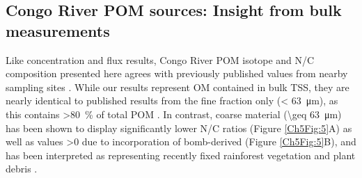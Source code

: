 \subsection{Congo River POM sources: Insight from bulk measurements}

Like concentration and flux results, Congo River POM isotope and N/C composition presented here agrees with previously published values from nearby sampling sites \citep{Mariotti:1991vx,Spencer:2012en,Spencer:2016ho}. While our results represent OM contained in bulk TSS, they are nearly identical to published results from the fine fraction only (\SI{< 63}{\micro m}), as this contains \SI{>80}{\%} of total POM \citep{Spencer:2012en}. In contrast, coarse material (\SI{\geq 63}{\micro m}) has been shown to display significantly lower N/C ratios (Figure \ref{Ch5Fig:5}A) as well as  values \SI{>0}{\permil} due to incorporation of bomb-derived  (Figure \ref{Ch5Fig:5}B), and has been interpreted as representing recently fixed rainforest vegetation and plant debris \citep{Spencer:2012en}. 

